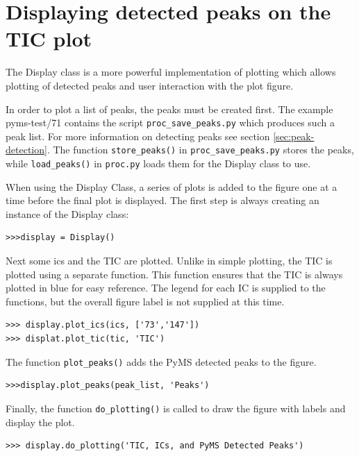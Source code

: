 \section{Displaying detected peaks on the TIC plot}


The Display class is a more powerful implementation of plotting which 
allows plotting of detected peaks and user interaction with the plot
figure.

In order to plot a list of peaks, the peaks must be created first.
The example pyms-test/71 contains the script {\tt proc\_save\_peaks.py}
which produces such a peak list. For more information on detecting peaks
see section \ref{sec:peak-detection}. The function {\tt store\_peaks()}
in {\tt proc\_save\_peaks.py} stores the peaks, while {\tt load\_peaks()}
in {\tt proc.py} loads them for the Display class to use.

When using the Display Class, a series of plots is added to the figure
one at a time before the final plot is displayed. The first step is
always creating an instance of the Display class:

\begin{verbatim}
>>>display = Display()
\end{verbatim}

Next some ics and the TIC are plotted. Unlike in simple plotting, the
TIC is plotted using a separate function. This function ensures that
the TIC is always plotted in blue for easy reference. The legend for
each IC is supplied to the functions, but the overall figure label
is not supplied at this time.

\begin{verbatim}
>>> display.plot_ics(ics, ['73','147'])
>>> displat.plot_tic(tic, 'TIC')
\end{verbatim}

The function {\tt plot\_peaks()} adds the PyMS detected peaks to the
figure.

\begin{verbatim}
>>>display.plot_peaks(peak_list, 'Peaks')
\end{verbatim}

Finally, the function {\tt do\_plotting()} is called to draw the figure with 
labels and display the plot.

\begin{verbatim}
>>> display.do_plotting('TIC, ICs, and PyMS Detected Peaks')
\end{verbatim}

